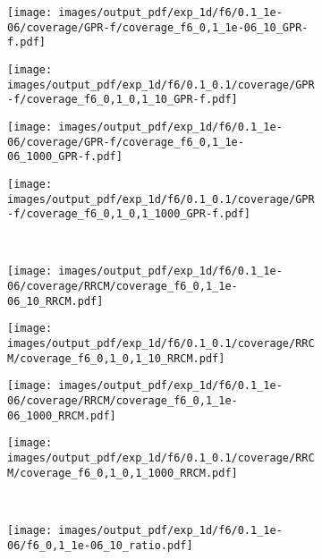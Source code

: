 \documentclass[a4paper,14pt]{extarticle}
\begin{document}
\begin{figure}%
  \centering
  \begin{subfigure}[b]{0.25\linewidth}
    \texttt{[image: images/output\_pdf/exp\_1d/f6/0.1\_1e-06/coverage/GPR-f/coverage\_f6\_0,1\_1e-06\_10\_GPR-f.pdf]}
  \end{subfigure}%
  \begin{subfigure}[b]{0.25\linewidth}
    \texttt{[image: images/output\_pdf/exp\_1d/f6/0.1\_0.1/coverage/GPR-f/coverage\_f6\_0,1\_0,1\_10\_GPR-f.pdf]}
  \end{subfigure}%
  \begin{subfigure}[b]{0.25\linewidth}
    \texttt{[image: images/output\_pdf/exp\_1d/f6/0.1\_1e-06/coverage/GPR-f/coverage\_f6\_0,1\_1e-06\_1000\_GPR-f.pdf]}
  \end{subfigure}%
  \begin{subfigure}[b]{0.25\linewidth}
    \texttt{[image: images/output\_pdf/exp\_1d/f6/0.1\_0.1/coverage/GPR-f/coverage\_f6\_0,1\_0,1\_1000\_GPR-f.pdf]}
  \end{subfigure}\\
  \begin{subfigure}[b]{0.25\linewidth}
    \texttt{[image: images/output\_pdf/exp\_1d/f6/0.1\_1e-06/coverage/RRCM/coverage\_f6\_0,1\_1e-06\_10\_RRCM.pdf]}
  \end{subfigure}%
  \begin{subfigure}[b]{0.25\linewidth}
    \texttt{[image: images/output\_pdf/exp\_1d/f6/0.1\_0.1/coverage/RRCM/coverage\_f6\_0,1\_0,1\_10\_RRCM.pdf]}
  \end{subfigure}%
  \begin{subfigure}[b]{0.25\linewidth}
    \texttt{[image: images/output\_pdf/exp\_1d/f6/0.1\_1e-06/coverage/RRCM/coverage\_f6\_0,1\_1e-06\_1000\_RRCM.pdf]}
  \end{subfigure}%
  \begin{subfigure}[b]{0.25\linewidth}
    \texttt{[image: images/output\_pdf/exp\_1d/f6/0.1\_0.1/coverage/RRCM/coverage\_f6\_0,1\_0,1\_1000\_RRCM.pdf]}
  \end{subfigure}\\
  \begin{subfigure}[b]{0.25\linewidth}
    \texttt{[image: images/output\_pdf/exp\_1d/f6/0.1\_1e-06/f6\_0,1\_1e-06\_10\_ratio.pdf]}
    \caption{} \label{fig:f6_1d_high_noise_arb_c1}
  \end{subfigure}%

\end{figure}
\end{document}
